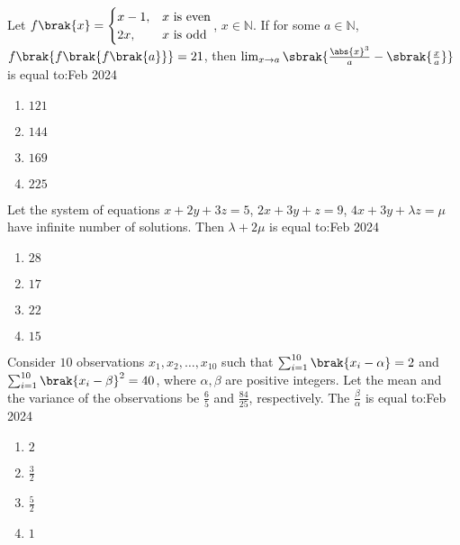 \iffalse
   \title{Assignment}
   \author{EE24BTECH11034}
   \section{mcq-single}
\fi 
    \item Let $f\brak{x}=\begin{cases}
    x-1, & x\text{ is even} \\
    2x, & x\text{ is odd}
    \end{cases}$, $x\in\mathbb{N}$. If for some $a\in\mathbb{N}$, $f\brak{f\brak{f\brak{a}}}=21$, then $\lim_{x\to a}\sbrak{\frac{\abs{x}^{3}}{a}-\sbrak{\frac{x}{a}}}$ is equal to:\hfill{Feb 2024}
    
        \begin{multicols}{4}
        \begin{enumerate}
        \item $121$
        \item $144$
        \item $169$
        \item $225$
        \end{enumerate}
        \end{multicols}

    \item Let the system of equations $x+2y+3z=5$, $2x+3y+z=9$, $4x+3y+\lambda z=\mu$ have infinite number of solutions. Then $\lambda+2\mu$ is equal to:\hfill{Feb 2024}
        
        \begin{multicols}{4}
        \begin{enumerate}
        \item $28$
        \item $17$
        \item $22$
        \item $15$
        \end{enumerate}
        \end{multicols}
        
    \item Consider $10$ observations $x_1, x_2, \ldots, x_{10}$ such that $\sum_{i=1}^{10}\brak{x_i-\alpha}=2$ and $\sum_{i=1}^{10}\brak{x_i-\beta}^{2}=40$, where $\alpha, \beta$ are positive integers. Let the mean and the variance of the observations be $\frac{6}{5}$ and $\frac{84}{25}$, respectively. The $\frac{\beta}{\alpha}$ is equal to:\hfill{Feb 2024}
        
        \begin{multicols}{4}
        \begin{enumerate}
        \item $2$
        \item $\frac{3}{2}$
        \item $\frac{5}{2}$
        \item $1$
        \end{enumerate}
        \end{multicols}

